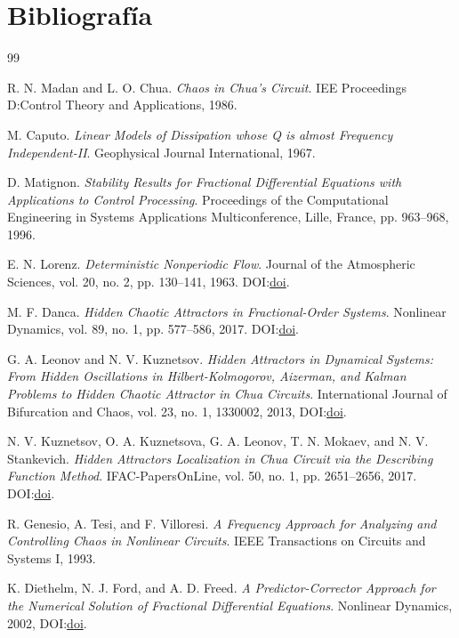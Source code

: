 \documentclass[11pt]{article}
\begin{document}
\section{Bibliografía}

\begin{thebibliography}{99}
\sloppy
\RaggedRight\relax

R. N. Madan and L. O. Chua.
\emph{Chaos in Chua's Circuit}.
IEE Proceedings D:\@ Control Theory and Applications, 1986.

M. Caputo.
\emph{Linear Models of Dissipation whose Q is almost Frequency Independent-II}.
Geophysical Journal International, 1967.

D. Matignon.
\emph{Stability Results for Fractional Differential Equations with Applications to Control Processing}.
Proceedings of the Computational Engineering in Systems Applications
Multiconference, Lille, France, pp. 963--968, 1996.

E. N. Lorenz.
\emph{Deterministic Nonperiodic Flow}.
Journal of the Atmospheric Sciences, vol. 20, no. 2, pp. 130--141, 1963.
DOI:\@ \href{https://doi.org/10.1175/1520-0469(1963)020<0130:DNF>2.0.CO;2}{doi}.

M. F. Danca.
\emph{Hidden Chaotic Attractors in Fractional-Order Systems}.
Nonlinear Dynamics, vol. 89, no. 1, pp. 577--586, 2017.
DOI:\@ \href{https://doi.org/10.1007/s11071-017-3472-7}{doi}.

G. A. Leonov and N. V. Kuznetsov.
\emph{Hidden Attractors in Dynamical Systems: From Hidden Oscillations in Hilbert-Kolmogorov, Aizerman, and Kalman Problems to Hidden Chaotic Attractor in Chua Circuits}.
International Journal of Bifurcation and Chaos, vol. 23, no. 1, 1330002,
2013, DOI:\@ \href{https://doi.org/10.1142/S0218127413300024}{doi}.

N. V. Kuznetsov, O. A. Kuznetsova, G. A. Leonov, T. N. Mokaev, and
N. V. Stankevich.
\emph{Hidden Attractors Localization in Chua Circuit via the Describing Function Method}.
IFAC-PapersOnLine, vol. 50, no. 1, pp. 2651--2656, 2017.
DOI:\@ \href{https://doi.org/10.1016/j.ifacol.2017.08.470}{doi}.

R. Genesio, A. Tesi, and F. Villoresi.
\emph{A Frequency Approach for Analyzing and Controlling Chaos in Nonlinear Circuits}.
IEEE Transactions on Circuits and Systems I, 1993.

K. Diethelm, N. J. Ford, and A. D. Freed.
\emph{A Predictor-Corrector Approach for the Numerical Solution of Fractional Differential Equations}.
Nonlinear Dynamics, 2002, DOI:\@ \href{https://doi.org/10.1023/A:1016592219341}{doi}.


\end{thebibliography}
\end{document}
